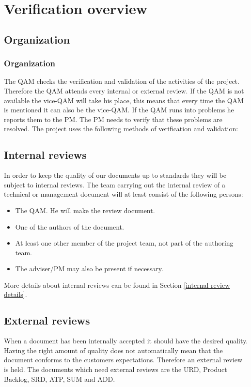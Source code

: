 \chapter{Verification overview}
\section{Organization}
\subsection{Organization}
   The QAM checks the verification and validation of the activities of the project. Therefore
   the QAM attends every internal or external review. If the QAM is not available the vice-QAM
   will take his place, this means that every time the QAM is mentioned it can also be the vice-QAM.
   If the QAM runs into problems he reports them to the PM. The PM needs to verify that these
   problems are resolved.
       The project uses the following methods of verification and validation:
\section{Internal reviews} \label{internal review}
   In order to keep the quality of our documents up to standards they will be subject to internal
   reviews.
       The team carrying out the internal review of a technical or management document will at least
   consist of the following persons:
\begin{itemize}
\item The QAM. He will make the review document.
\item One of the authors of the document.
\item At least one other member of the project team, not part of the authoring team.
\item The adviser/PM may also be present if necessary.
\end{itemize}
More details about internal reviews can be found in Section \ref{internal review details}.
\section{External reviews} \label{external review}
When a document has been internally accepted it should have the desired quality. Having the right amount of quality does not automatically mean that the document conforms to the customers expectations. Therefore an external review is held. The documents which need external reviews are the URD, Product Backlog, SRD, ATP, SUM and ADD.

